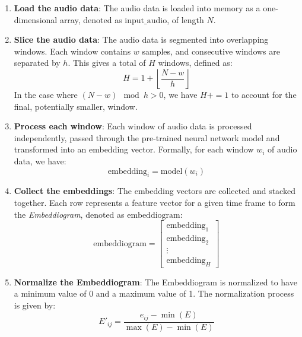 \begin{enumerate}
\item \textbf{Load the audio data}: The audio data is loaded into memory as a one-dimensional array, denoted as $\text{input\_audio}$, of length $N$.

\item \textbf{Slice the audio data}: The audio data is segmented into overlapping windows. Each window contains $w$ samples, and consecutive windows are separated by $h$. This gives a total of $H$ windows, defined as:
\begin{equation}
H = 1 + \left\lfloor \frac{N - w}{h} \right\rfloor
\end{equation}
In the case where $\left( N - w \right) \mod h > 0$, we have $H += 1$ to account for the final, potentially smaller, window.

\item \textbf{Process each window}: Each window of audio data is processed independently, passed through the pre-trained neural network model and transformed into an embedding vector. Formally, for each window $w_i$ of audio data, we have:
\begin{equation}
\text{embedding}_i = \text{model}(w_i)
\end{equation}

\item \textbf{Collect the embeddings}: The embedding vectors are collected and stacked together. Each row represents a feature vector for a given time frame to form the \textit{Embeddiogram}, denoted as $\text{embeddiogram}$:
\begin{equation}
\text{embeddiogram} = \begin{bmatrix} \text{embedding}_1 \\ \text{embedding}_2 \\ \vdots \\ \text{embedding}_H \end{bmatrix}
\end{equation}

\item \textbf{Normalize the Embeddiogram}: The Embeddiogram is normalized to have a minimum value of 0 and a maximum value of 1. The normalization process is given by:
\begin{equation}
E'_{ij} = \frac{e_{ij} - \min(E)}{\max(E) - \min(E)}
\end{equation}
\end{enumerate}
